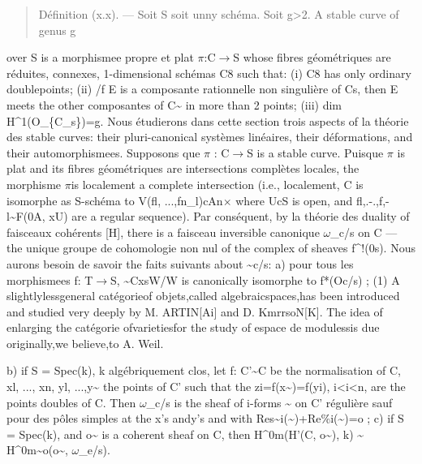\documentclass[11pt]{article}
\theoremstyle{plain}
\theoremstyle{definition}
\theoremstyle{remark}
\begin{document}
\begin{quote}D\'efinition (x.x). --- Soit S soit unny sch\'ema. Soit g>2. A stable curve of genus g\end{quote}
over S is a morphismee propre et plat $\pi$:C$\to$S whose fibres g\'eom\'etriques are r\'eduites, connexes, 1-dimensional sch\'emas C8 such that: (i) C8 has only ordinary doublepoints; (ii) /f E is a composante rationnelle non singuli\`ere of Cs, then E meets the other composantes of C\textasciitilde{} in more than 2 points; (iii) dim H\textasciicircum{}1(O\_\{C\_s\})=g. Nous \'etudierons dans cette section trois aspects of la th\'eorie des stable curves: their pluri-canonical syst\`emes lin\'eaires, their d\'eformations, and their automorphismees. Supposons que $\pi$ : C$\to$S is a stable curve. Puisque $\pi$ is plat and its fibres g\'eom\'etriques are intersections compl\`etes locales, the morphisme $\pi$is localement a complete intersection (i.e., localement, C is isomorphe as S-sch\'ema to V(fl, ...,fn\_l)cAn$\times$ where UcS is open, and fl,.-.,f,-l\textasciitilde{}F(0A, xU) are a regular sequence). Par cons\'equent, by la th\'eorie des duality of faisceaux coh\'erents [H], there is a faisceau inversible canonique $\omega$\_c/s on C --- the unique groupe de cohomologie non nul of the complex of sheaves f\textasciicircum{}!(0s). Nous aurons besoin de savoir the faits suivants about \textasciitilde{}c/s: a) pour tous les morphismees f: T$\to$S, \textasciitilde{}CxsW/W is canonically isomorphe to f*(Oc/s) ; (1) A slightlylessgeneral cat\'egorieof objets,called algebraicspaces,has been introduced and studied very deeply by M. ARTIN[Ai] and D. KmrrsoN[K]. The idea of enlarging the cat\'egorie ofvarietiesfor the study of espace de modulessis due originally,we believe,to A. Weil.

b) if S = Spec(k), k alg\'ebriquement clos, let f: C'\textasciitilde{}C be the normalisation of C, xl, ..., xn, yl, ...,y\textasciitilde{} the points of C' such that the zi=f(x\textasciitilde{})=f(yi), i<i<n, are the points doubles of C. Then $\omega$\_c/s is the sheaf of i-forms \textasciitilde{} on C' r\'eguli\`ere sauf pour des p\^oles simples at the x's andy's and with Res\textasciitilde{}i(\textasciitilde{})+Re\%i(\textasciitilde{})=o ; c) if S = Spec(k), and o\textasciitilde{} is a coherent sheaf on C, then H\textasciicircum{}0m(H'(C, o\textasciitilde{}), k) \textasciitilde{} H\textasciicircum{}0m\textasciitilde{}o(o\textasciitilde{}, $\omega$\_e/s).
\end{document}
